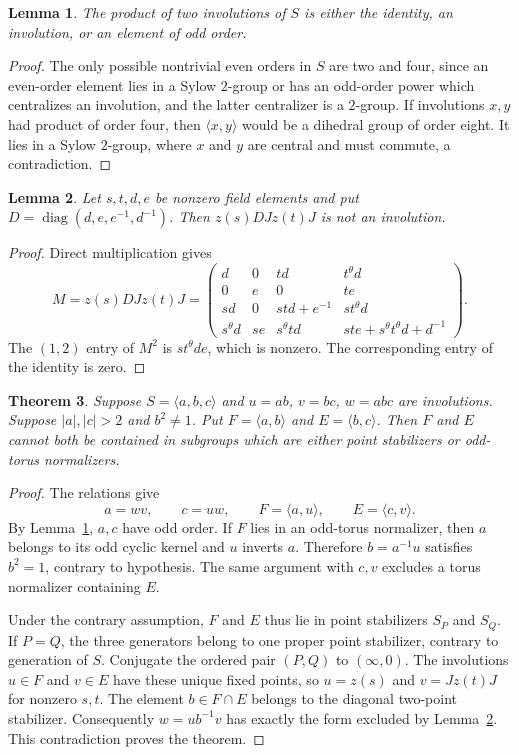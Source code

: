 \documentclass[11pt,a4paper]{article}
\newtheorem{lemma}{Lemma}
\newtheorem{theorem}[lemma]{Theorem}
\newcommand{\gen}[1]{\langle#1\rangle}
\begin{document}
\begin{lemma}\label{odd}
The product of two involutions of $S$ is either the identity, an
involution, or an element of odd order.
\end{lemma}
\begin{proof}
The only possible nontrivial even orders in $S$ are two and four, since
an even-order element lies in a Sylow $2$-group or has an odd-order
power which centralizes an involution, and the latter centralizer is a
$2$-group. If involutions $x,y$ had product of order four, then
$\gen{x,y}$ would be a dihedral group of order eight. It lies in a
Sylow $2$-group, where $x$ and $y$ are central and must commute, a
contradiction.
\end{proof}

\begin{lemma}\label{opposite}
Let $s,t,d,e$ be nonzero field elements and put
$D=\operatorname{diag}(d,e,e^{-1},d^{-1})$. Then
$z(s)D Jz(t)J$ is not an involution.
\end{lemma}
\begin{proof}
Direct multiplication gives
\[
 M=z(s)D Jz(t)J=
 \begin{pmatrix}
 d&0&td&t^\theta d\\
 0&e&0&te\\
 sd&0&std+e^{-1}&s t^\theta d\\
 s^\theta d&se&s^\theta td&ste+s^\theta t^\theta d+d^{-1}
 \end{pmatrix}.
\]
The $(1,2)$ entry of $M^2$ is $s t^\theta de$, which is nonzero.
The corresponding entry of the identity is zero.
\end{proof}

\begin{theorem}\label{main}
Suppose $S=\gen{a,b,c}$ and $u=ab$, $v=bc$, $w=abc$ are
involutions. Suppose $|a|,|c|>2$ and $b^2\ne1$. Put
$F=\gen{a,b}$ and $E=\gen{b,c}$. Then $F$ and $E$ cannot both
be contained in subgroups which are either point stabilizers or
odd-torus normalizers.
\end{theorem}
\begin{proof}
The relations give
\[
 a=wv,\qquad c=uw,\qquad F=\gen{a,u},\qquad E=\gen{c,v}.
\]
By Lemma~\ref{odd}, $a,c$ have odd order. If $F$ lies in an
odd-torus normalizer, then $a$ belongs to its odd cyclic kernel and
$u$ inverts $a$. Therefore $b=a^{-1}u$ satisfies $b^2=1$, contrary
to hypothesis. The same argument with $c,v$ excludes a torus
normalizer containing $E$.

Under the contrary assumption, $F$ and $E$ thus lie in point
stabilizers $S_P$ and $S_Q$. If $P=Q$, the three generators belong
to one proper point stabilizer, contrary to generation of $S$.
Conjugate the ordered pair $(P,Q)$ to $(\infty,0)$. The involutions
$u\in F$ and $v\in E$ have these unique fixed points, so
$u=z(s)$ and $v=Jz(t)J$ for nonzero $s,t$. The element
$b\in F\cap E$ belongs to the diagonal two-point stabilizer.
Consequently $w=u b^{-1}v$ has exactly the form excluded by
Lemma~\ref{opposite}. This contradiction proves the theorem.
\end{proof}
\end{document}
